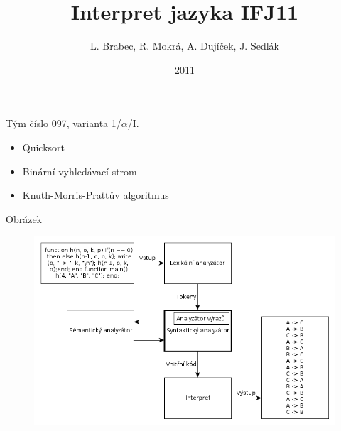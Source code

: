 \documentclass{beamer}
\title[Interpret jazyka IFJ11]{Interpret jazyka IFJ11}
\institute{FIT VUT Brno}
\author{~~L. Brabec, R. Mokrá, A. Dujíček, J. Sedlák~~\\}
\date{2011}
\begin{document}
\begin{frame}
  \maketitle
\end{frame}

\begin{frame}
  Tým číslo 097, varianta 1/$\alpha$/I.
  \begin{itemize}
  \item Quicksort
  \item Binární vyhledávací strom
  \item Knuth-Morris-Prattův algoritmus
  \end{itemize}
\end{frame}

\begin{frame}{Obrázek}
  \begin{figure}
    \includegraphics[scale=0.45]{schema.png}
  \end{figure}
\end{frame}
\end{document}
